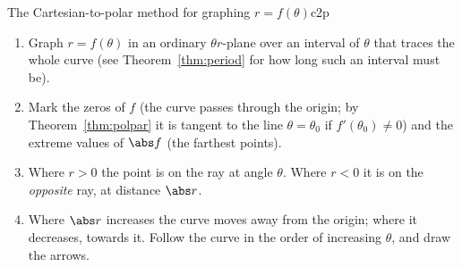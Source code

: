 \documentclass[11pt]{article}
\begin{document}
\begin{proc}{The Cartesian-to-polar method for graphing $r=f(\theta)$}{c2p}
\begin{enumerate}[nosep]
  \item Graph $r=f(\theta)$ in an ordinary $\theta r$-plane over an interval of $\theta$ that traces the whole curve (see Theorem~\ref{thm:period} for how long such an interval must be).
  \item Mark the zeros of $f$ (the curve passes through the origin; by Theorem~\ref{thm:polpar} it is tangent to the line $\theta=\theta_0$ if $f'(\theta_0)\ne0$) and the extreme values of $\abs f$ (the farthest points).
  \item Where $r>0$ the point is on the ray at angle $\theta$. Where $r<0$ it is on the \emph{opposite} ray, at distance $\abs r$.
  \item Where $\abs r$ increases the curve moves away from the origin; where it decreases, towards it. Follow the curve in the order of increasing $\theta$, and draw the arrows.
\end{enumerate}
\end{proc}
\end{document}
